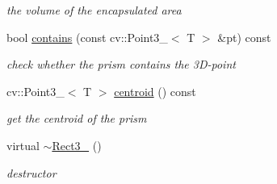 \begin{DoxyCompactItemize}
\begin{DoxyCompactList}\small\item\em the volume of the encapsulated area \end{DoxyCompactList}\item 
bool \hyperlink{classRect3___ad9928349a9a8bca8f98a1bf1cab676e9}{contains} (const cv\-::\-Point3\-\_\-$<$ T $>$ \&pt) const 
\begin{DoxyCompactList}\small\item\em check whether the prism contains the 3\-D-\/point \end{DoxyCompactList}\item 
cv\-::\-Point3\-\_\-$<$ T $>$ \hyperlink{classRect3___addafb9e6380c9a3ffd4f394d311c59b6}{centroid} () const 
\begin{DoxyCompactList}\small\item\em get the centroid of the prism \end{DoxyCompactList}\item 
virtual \hyperlink{classRect3___a297683142c5197991bfaabdb2305a37c}{$\sim$\-Rect3\-\_\-} ()
\begin{DoxyCompactList}\small\item\em destructor \end{DoxyCompactList}\end{DoxyCompactItemize}
